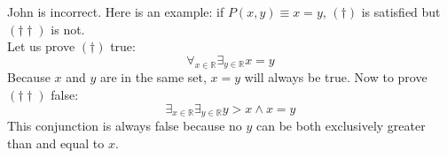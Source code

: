 \documentclass[draft]{article}
\begin{document}
\section{}
John is incorrect. Here is an example: if $P(x,y) \equiv x=y$, $(\dag)$ is satisfied but $(\dag\dag)$ is not.\\
Let us prove $(\dag)$ true:
\begin{equation*}
    \mathop{\forall}_{x \in \mathbb{R}} \mathop{\exists}_{y \in \mathbb{R}} x=y 
\end{equation*} 
Because $x$ and $y$ are in the same set, $x = y$ will always be true. Now to prove $(\dag\dag)$ false:
\begin{equation*}
    \mathop{\exists}_{x \in \mathbb{R}} \mathop{\exists}_{y \in \mathbb{R}} y>x \land x=y 
\end{equation*}
This conjunction is always false because no $y$ can be both exclusively greater than and equal to $x$.
\end{document}
